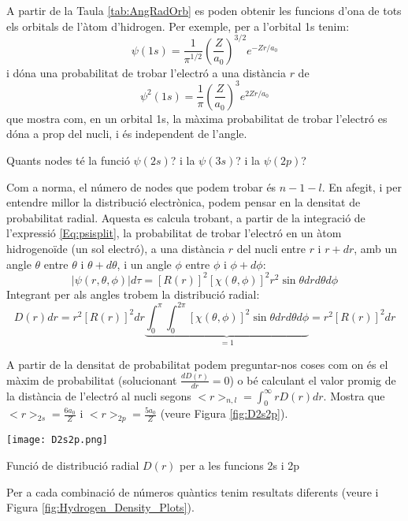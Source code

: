 A partir de la Taula \ref{tab:AngRadOrb} es poden obtenir les funcions d'ona de tots els orbitals de l'àtom d'hidrogen. Per exemple, per a l'orbital 1s tenim:
\[
\psi(1s)= \frac{1}{\pi^{1/2}} \left( \frac{Z}{a_0} \right)^{3/2} e^{-Zr/a_0}
\]
i dóna una probabilitat de trobar l'electró a una distància $r$ de
\[
\psi^2(1s)= \frac{1}{\pi} \left( \frac{Z}{a_0} \right)^{3} e^{2Zr/a_0}
\]
que mostra com, en un orbital 1s, la màxima probabilitat de trobar l'electró es dóna a prop del nucli, i és independent de l'angle. 

\begin{exr}
Quants nodes té la funció $\psi(2s)$? i la $\psi(3s)$? i la $\psi(2p)$? 
\end{exr}
Com a norma, el número de nodes que podem trobar és $n-1-l$. 
En afegit, i per entendre millor la distribució electrònica, podem pensar en la densitat de probabilitat radial.
Aquesta es calcula trobant, a partir de la integració de l'expressió \ref{Eq:psisplit}, la probabilitat de trobar l'electró en un àtom hidrogenoïde (un sol electró), a una distància $r$ del nucli entre $r$ i $r+dr$, amb un angle $\theta$ entre $\theta$ i $\theta+d\theta$, i un angle $\phi$ entre $\phi$ i $\phi+d\phi$:
\[
|\psi(r,\theta,\phi)| d\tau = [R(r)]^2 [\chi(\theta,\phi)]^2 r^2 \sin \theta dr d\theta d\phi
\]
Integrant per als angles trobem la distribució radial:
\[
D(r)dr=r^2[R(r)]^2 dr \underbrace{\int_0^{\pi} \int_0^{2\pi} [\chi(\theta,\phi)]^2 \sin \theta dr d\theta d\phi}_{=1}=r^2[R(r)]^2 dr
\]
\begin{exr}
A partir de la densitat de probabilitat podem preguntar-nos coses com on és el màxim de probabilitat (solucionant  $\frac{d D(r)}{dr}=0$) o bé calculant el valor promig de la distància de l'electró al nucli segons $<r>_{n,l}=\int_0^{\infty} r D(r)dr$. Mostra que $<r>_{2s}=\frac{6a_0}{Z}$ i $<r>_{2p}=\frac{5a_0}{Z}$ (veure Figura \ref{fig:D2s2p}).%
\end{exr}

\begin{marginfigure}
\centering
\texttt{[image: D2s2p.png]}
\caption{Funció de distribució radial $D(r)$ per a les funcions 2s i 2p}
\label{fig:D2s2p}
\end{marginfigure}

Per a cada combinació de números quàntics tenim resultats diferents (veure  i Figura \ref{fig:Hydrogen_Density_Plots}).


